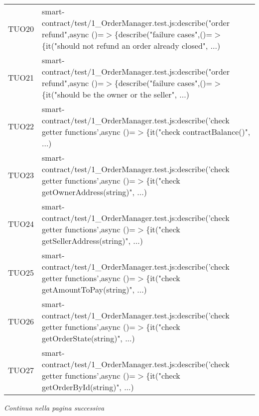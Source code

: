 \begin{table}[H]
\begin{tabular}{c|p{15cm}}
    TUO20 & smart-contract/test/1\_OrderManager.test.js:describe("order refund",\newline async ()=$>$\{describe("failure cases",()=$>$\{it("should not refund an order already closed", ...)                         \\
    TUO21 & smart-contract/test/1\_OrderManager.test.js:describe("order refund",\newline async ()=$>$\{describe("failure cases",()=$>$\{it("should be the owner or the seller", ...)                                 \\
    TUO22 & smart-contract/test/1\_OrderManager.test.js:describe('check getter functions',\newline async ()=$>$\{it("check contractBalance()", ...)                                                                  \\
    TUO23 & smart-contract/test/1\_OrderManager.test.js:describe('check getter functions',\newline async ()=$>$\{it("check getOwnerAddress(string)", ...)                                                            \\
    TUO24 & smart-contract/test/1\_OrderManager.test.js:describe('check getter functions',\newline async ()=$>$\{it("check getSellerAddress(string)", ...)                                                           \\
    TUO25 & smart-contract/test/1\_OrderManager.test.js:describe('check getter functions',\newline async ()=$>$\{it("check getAmountToPay(string)", ...)                                                             \\
    TUO26 & smart-contract/test/1\_OrderManager.test.js:describe('check getter functions',\newline async ()=$>$\{it("check getOrderState(string)", ...)                                                              \\
    TUO27 & smart-contract/test/1\_OrderManager.test.js:describe('check getter functions',\newline async ()=$>$\{it("check getOrderById(string)", ...)                                                               \\
  \end{tabular}
\end{table}
\begin{center}
  \textit{\small Continua nella pagina successiva}
\end{center}

